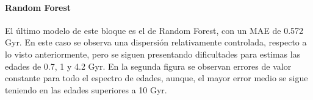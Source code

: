 \paragraph{Random Forest} 
El último modelo de este bloque es el de Random Forest, con un MAE de 0.572 Gyr. En este caso se observa una dispersión relativamente controlada, respecto a lo visto anteriormente, pero se siguen presentando dificultades para estimas las edades de 0.7, 1 y 4.2 Gyr. En la segunda figura se observan errores de valor constante para todo el espectro de edades, aunque, el mayor error medio se sigue teniendo en las edades superiores a 10 Gyr.

\begin{figure}[h]
\begin{minipage}{.33\linewidth}
\centering
{}
\end{minipage}%
\begin{minipage}{.33\linewidth}
\centering
{}

\end{minipage}
\end{figure}
